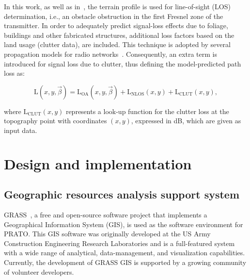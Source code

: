 In this work, as well as in~\cite{Filiposka_Terrain_aware_three_dimensional_radio_propagation_model_extension_for_NS2:2011},
the terrain profile is used for line-of-sight (LOS)
determination, i.e., an obstacle obstruction in the first Fresnel
zone of the transmitter. In order to adequately predict signal-loss
effects due to foliage, buildings and other fabricated structures,
additional loss factors based on the land usage (clutter data), are
included. This technique is adopted by several propagation models
for radio networks~\cite{Aarnaes-Tuning_of_empirical_radio_propagation_models_effect_of_location_accuracy:2004,Begovic_Applicability_evaluation_of_Okumura_Ericsson_and_Winner_propagation_models_for_coverage_planning:2012,Neskovic_Microcell_electric_field_strength_prediction_model:2010}.
Consequently, an extra term is introduced for signal loss due to clutter,
thus defining the model-predicted path loss as:

\begin{equation}
\mathrm{L}(x,y,\vec{\beta})=\mathrm{L}{}_{\mathrm{OA}}(x,y,\vec{\beta})+\mathrm{L}_{\mathrm{NLOS}}(x,y)+\mathrm{L}{}_{\mathrm{CLUT}}(x,y),\label{eq:04-Hata_pathloss}
\end{equation}


\noindent {}

\noindent where $\mathrm{L}{}_{\mathrm{CLUT}}(x,y)$ represents a
look-up function for the clutter loss at the topography point with
coordinates $(x,y)$, expressed in dB, which are given as input data.


\section{Design and implementation \label{sec:04-Design_and_implementation}}


\subsection{Geographic resources analysis support system}

GRASS~\cite{Neteler_Open_source_GIS_a_GRASS_GIS_approach}, a free
and open-source software project that implements a Geographical Information
System (GIS),
is used as the software environment for PRATO. This GIS software was
originally developed at the US Army Construction Engineering Research
Laboratories and is a full-featured system with a wide range of analytical,
data-management, and visualization capabilities. Currently, the development
of GRASS GIS is supported by a growing community of volunteer developers.

